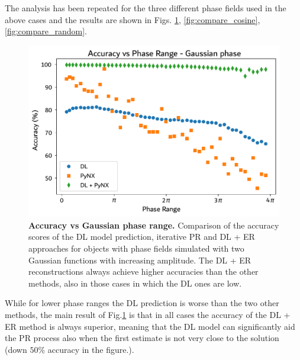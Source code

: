The analysis has been repeated for the three different phase fields used in the above cases and the results are 
shown in Figs. \ref{fig:compare_gauss}, \ref{fig:compare_cosine}, \ref{fig:compare_random}. 

\begin{figure}[H]
    \centering
    \includegraphics[width=\textwidth]{figures/Phasing/plot_acc_comparison_gauss_winter.pdf}
    \caption{\textbf{Accuracy vs Gaussian phase range.} Comparison of the accuracy scores of the DL model prediction, 
    iterative PR and DL + ER approaches for objects with 
    phase fields simulated with two Gaussian functions with increasing amplitude. The DL + ER reconstructions always achieve 
    higher accuracies than the other methods, also in those cases in which the DL ones are low.}
    \label{fig:compare_gauss}
\end{figure}

While for lower phase ranges the DL prediction is worse than the two other methods, the main result of Fig.\ref{fig:compare_gauss} 
is that in all cases the accuracy of the DL + ER method is always superior, meaning that the DL model can significantly 
aid the PR process also when the first estimate is not very close to the solution (down $50\%$ accuracy in the figure.).

